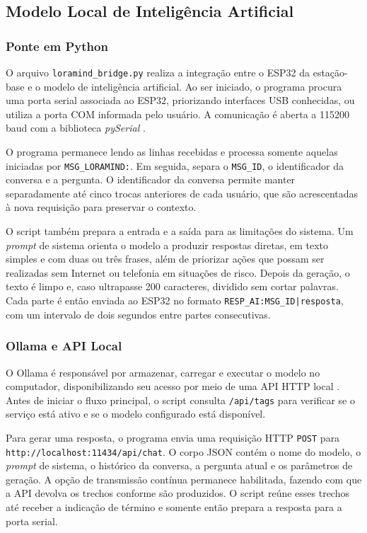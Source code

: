 \documentclass[12pt]{article}
\begin{document}
\subsection{Modelo Local de Inteligência Artificial}
\label{subsec:modelo-local-ia}

\subsubsection{Ponte em Python}

O arquivo \texttt{loramind\_bridge.py} realiza a integração entre o ESP32 da estação-base e o modelo de inteligência artificial. Ao ser iniciado, o programa procura uma porta serial associada ao ESP32, priorizando interfaces USB conhecidas, ou utiliza a porta COM informada pelo usuário. A comunicação é aberta a 115200 baud com a biblioteca \textit{pySerial} \cite{pyserial2026}.

O programa permanece lendo as linhas recebidas e processa somente aquelas iniciadas por \texttt{MSG\_LORAMIND:}. Em seguida, separa o \texttt{MSG\_ID}, o identificador da conversa e a pergunta. O identificador da conversa permite manter separadamente até cinco trocas anteriores de cada usuário, que são acrescentadas à nova requisição para preservar o contexto.

O script também prepara a entrada e a saída para as limitações do sistema. Um \textit{prompt} de sistema orienta o modelo a produzir respostas diretas, em texto simples e com duas ou três frases, além de priorizar ações que possam ser realizadas sem Internet ou telefonia em situações de risco. Depois da geração, o texto é limpo e, caso ultrapasse 200 caracteres, dividido sem cortar palavras. Cada parte é então enviada ao ESP32 no formato \texttt{RESP\_AI:MSG\_ID|resposta}, com um intervalo de dois segundos entre partes consecutivas.

\subsubsection{Ollama e API Local}

O Ollama é responsável por armazenar, carregar e executar o modelo no computador, disponibilizando seu acesso por meio de uma API HTTP local \cite{ollamaapi2026}. Antes de iniciar o fluxo principal, o script consulta \texttt{/api/tags} para verificar se o serviço está ativo e se o modelo configurado está disponível.

Para gerar uma resposta, o programa envia uma requisição HTTP \texttt{POST} para \texttt{http://localhost:11434/api/chat}. O corpo JSON contém o nome do modelo, o \textit{prompt} de sistema, o histórico da conversa, a pergunta atual e os parâmetros de geração. A opção de transmissão contínua permanece habilitada, fazendo com que a API devolva os trechos conforme são produzidos. O script reúne esses trechos até receber a indicação de término e somente então prepara a resposta para a porta serial.
\end{document}
